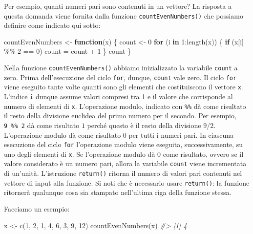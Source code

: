 \documentclass[
  11pt,
]{krantz}
\makeatletter
\newenvironment{Shaded}{\begin{snugshade}}{\end{snugshade}}
\newcommand{\CommentTok}[1]{\textcolor[rgb]{0.37,0.37,0.37}{\textit{#1}}}
\newcommand{\ControlFlowTok}[1]{\textcolor[rgb]{0.27,0.27,0.27}{\textbf{#1}}}
\newcommand{\DecValTok}[1]{\textcolor[rgb]{0.06,0.06,0.06}{#1}}
\newcommand{\FunctionTok}[1]{\textcolor[rgb]{0,0,0}{#1}}
\newcommand{\NormalTok}[1]{#1}
\newcommand{\OtherTok}[1]{\textcolor[rgb]{0.37,0.37,0.37}{#1}}
\newcommand{\SpecialCharTok}[1]{\textcolor[rgb]{0,0,0}{#1}}
\newenvironment{kframe}{%
\medskip{}
\setlength{\fboxsep}{.8em}
 \def\at@end@of@kframe{}%
 \ifinner\ifhmode%
  \def\at@end@of@kframe{\end{minipage}}%
  \begin{minipage}{\columnwidth}%
 \fi\fi%
 \def\FrameCommand##1{\hskip\@totalleftmargin \hskip-\fboxsep
 \colorbox{shadecolor}{##1}\hskip-\fboxsep
     \hskip-\linewidth \hskip-\@totalleftmargin \hskip\columnwidth}%
 \MakeFramed {\advance\hsize-\width
   \@totalleftmargin\z@ \linewidth\hsize
   \@setminipage}}%
 {\par\unskip\endMakeFramed%
 \at@end@of@kframe}
\renewenvironment{Shaded}{\begin{kframe}}{\end{kframe}}
\theoremstyle{definition}
\theoremstyle{definition}
\theoremstyle{definition}
\theoremstyle{definition}
\theoremstyle{remark}
\makeatother
\begin{document}
Per esempio, quanti numeri pari sono contenuti in un vettore? La risposta a questa domanda viene fornita dalla funzione \texttt{countEvenNumbers()} che possiamo definire come indicato qui sotto:

\begin{Shaded}
\begin{Highlighting}[]
\NormalTok{countEvenNumbers }\OtherTok{\textless{}{-}} \ControlFlowTok{function}\NormalTok{(x) \{}
\NormalTok{  count }\OtherTok{\textless{}{-}} \DecValTok{0}
  \ControlFlowTok{for}\NormalTok{ (i }\ControlFlowTok{in} \DecValTok{1}\SpecialCharTok{:}\FunctionTok{length}\NormalTok{(x)) \{}
    \ControlFlowTok{if}\NormalTok{ (x[i] }\SpecialCharTok{\%\%} \DecValTok{2} \SpecialCharTok{==} \DecValTok{0}\NormalTok{)  }
\NormalTok{      count }\OtherTok{=}\NormalTok{ count }\SpecialCharTok{+} \DecValTok{1}
\NormalTok{  \}}
\NormalTok{  count}
\NormalTok{\}}
\end{Highlighting}
\end{Shaded}

Nella funzione \texttt{countEvenNumbers()} abbiamo inizializzato la variabile \texttt{count} a zero. Prima dell'esecuzione del ciclo \texttt{for}, dunque, \texttt{count} vale zero. Il ciclo \texttt{for} viene eseguito tante volte quanti sono gli elementi che costituiscono il vettore \texttt{x}. L'indice \texttt{i} dunque assume valori compresi tra 1 e il valore che corrisponde al numero di elementi di \texttt{x}. L'operazione modulo, indicato con \texttt{\%\%} dà come risultato il resto della divisione euclidea del primo numero per il secondo. Per esempio, \texttt{9\ \%\%\ 2} dà come risultato \(1\) perché questo è il resto della divisione \(9/2\). L'operazione modulo dà come risultato \(0\) per tutti i numeri pari. In ciascuna esecuzione del ciclo \texttt{for} l'operazione modulo viene eseguita, successivamente, su uno degli elementi di \texttt{x}. Se l'operazione modulo dà \(0\) come risultato, ovvero se il valore considerato è un numero pari, allora la variabile \texttt{count} viene incrementata di un'unità. L'istruzione \texttt{return()} ritorna il numero di valori pari contenuti nel vettore di input alla funzione. Si noti che è necessario usare \texttt{return()}: la funzione ritornerà qualunque cosa sia stampato nell'ultima riga della funzione stessa.

Facciamo un esempio:

\begin{Shaded}
\begin{Highlighting}[]
\NormalTok{x }\OtherTok{\textless{}{-}} \FunctionTok{c}\NormalTok{(}\DecValTok{1}\NormalTok{, }\DecValTok{2}\NormalTok{, }\DecValTok{1}\NormalTok{, }\DecValTok{4}\NormalTok{, }\DecValTok{6}\NormalTok{, }\DecValTok{3}\NormalTok{, }\DecValTok{9}\NormalTok{, }\DecValTok{12}\NormalTok{)}
\FunctionTok{countEvenNumbers}\NormalTok{(x)}
\CommentTok{\#\textgreater{} [1] 4}
\end{Highlighting}
\end{Shaded}
\end{document}
